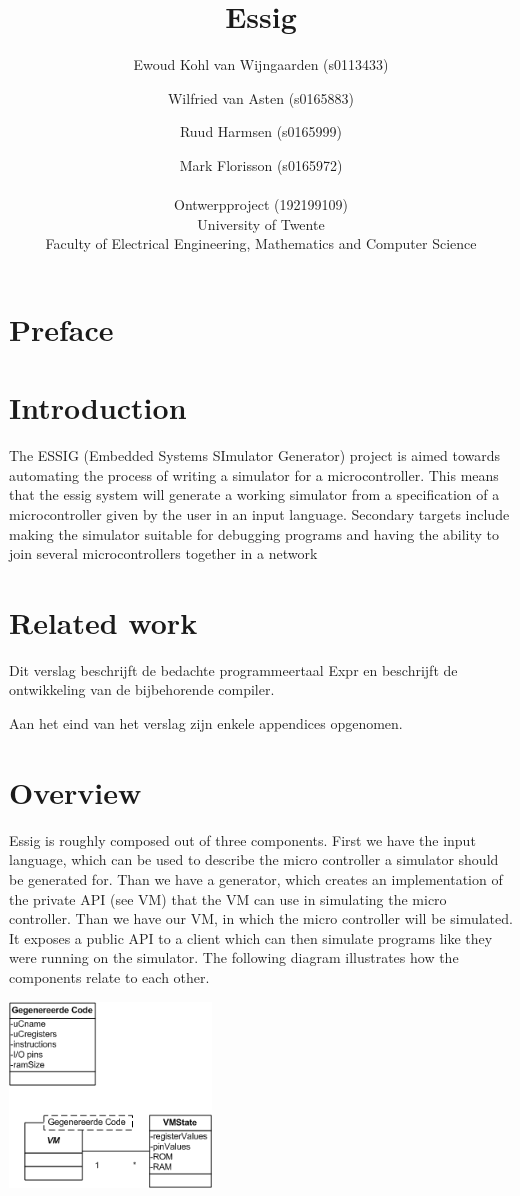 \documentclass[a4paper]{report}
\title{Essig}
\author{
	Ewoud Kohl van Wijngaarden (s0113433)
	\and
	Wilfried van Asten (s0165883)
	\and
	Ruud Harmsen (s0165999)
	\and
	Mark Florisson (s0165972)
	\\
	\\
	\small Ontwerpproject (192199109) \\
	\small University of Twente \\
	\small Faculty of Electrical Engineering, Mathematics and Computer Science
}
\date{}
\begin{document}
\maketitle

\setcounter{tocdepth}{10}
\renewcommand\contentsname{Table of Contents}
\tableofcontents
\clearpage{}
\chapter{Preface}


\chapter{Introduction}
The ESSIG (Embedded Systems SImulator Generator) project is aimed
towards automating the process of writing a simulator for a
microcontroller. This means that the essig system will generate a
working simulator from a specification of a microcontroller given by
the user in an input language. Secondary targets include making the
simulator suitable for debugging programs and having the ability to
join several microcontrollers together in a network

\chapter{Related work}
Dit verslag beschrijft de bedachte programmeertaal Expr en beschrijft de
ontwikkeling van de bijbehorende compiler.

Aan het eind van het verslag zijn enkele appendices opgenomen.

\chapter{Overview}
Essig is roughly composed out of three components. First we have the
input language, which can be used to describe the micro controller a
simulator should be generated for. Than we have a generator, which
creates an implementation of the private API (see VM) that the VM can
use in simulating the micro controller. Than we have our VM, in which
the micro controller will be simulated. It exposes a public API to a
client which can then simulate programs like they were running on the
simulator. The following diagram illustrates how the components relate
to each other.

\begin{center}
\includegraphics[width=5.376cm,height=4.932cm]{Essig-img002.png}
\end{center}
\end{document}
